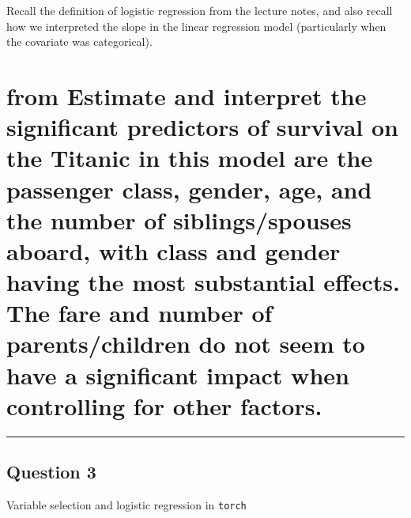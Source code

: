 \documentclass[
  letterpaper,
  DIV=11,
  numbers=noendperiod]{scrartcl}
\begin{document}
Recall the definition of logistic regression from the lecture notes, and
also recall how we interpreted the slope in the linear regression model
(particularly when the covariate was categorical).

\hypertarget{from-estimate-and-interpret-the-significant-predictors-of-survival-on-the-titanic-in-this-model-are-the-passenger-class-gender-age-and-the-number-of-siblingsspouses-aboard-with-class-and-gender-having-the-most-substantial-effects.-the-fare-and-number-of-parentschildren-do-not-seem-to-have-a-significant-impact-when-controlling-for-other-factors.}{%
\section{from Estimate and interpret the significant predictors of
survival on the Titanic in this model are the passenger class, gender,
age, and the number of siblings/spouses aboard, with class and gender
having the most substantial effects. The fare and number of
parents/children do not seem to have a significant impact when
controlling for other
factors.}\label{from-estimate-and-interpret-the-significant-predictors-of-survival-on-the-titanic-in-this-model-are-the-passenger-class-gender-age-and-the-number-of-siblingsspouses-aboard-with-class-and-gender-having-the-most-substantial-effects.-the-fare-and-number-of-parentschildren-do-not-seem-to-have-a-significant-impact-when-controlling-for-other-factors.}}

\begin{center}\rule{0.5\linewidth}{0.5pt}\end{center}

\hypertarget{question-3}{%
\subsection{Question 3}\label{question-3}}

\begin{tcolorbox}[enhanced jigsaw, breakable, opacitybacktitle=0.6, colbacktitle=quarto-callout-tip-color!10!white, colframe=quarto-callout-tip-color-frame, rightrule=.15mm, toptitle=1mm, left=2mm, titlerule=0mm, coltitle=black, opacityback=0, leftrule=.75mm, bottomtitle=1mm, arc=.35mm, toprule=.15mm, bottomrule=.15mm, title=\textcolor{quarto-callout-tip-color}{\faLightbulb}\hspace{0.5em}{70 points}, colback=white]

Variable selection and logistic regression in \texttt{torch}

\end{tcolorbox}
\end{document}
